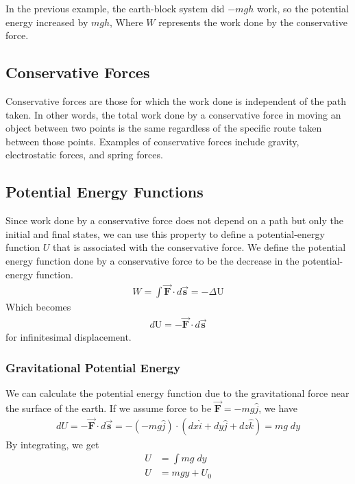 \documentclass[11pt]{article}
\begin{document}
In the previous example, the earth-block system did $-mgh$ work, so the potential energy increased by $mgh$, Where $W$ represents the work done by the conservative force.

\subsection{Conservative Forces}

Conservative forces are those for which the work done is independent of the path taken. In other words, the total work done by a conservative force in moving an object between two points is the same regardless of the specific route taken between those points. Examples of conservative forces include gravity, electrostatic forces, and spring forces.

\subsection{Potential Energy Functions}
Since work done by a conservative force does not depend on a path but only the initial and final states, we can use this property to define a potential-energy function $U$ that is associated with the conservative force. We define the potential energy function done by a conservative force to be the decrease in the potential-energy function.
\begin{align*}
    W = \int \mathbf{\Vec{F}}\cdot d\mathbf{\Vec{s}} = -\Delta \mathrm{U}
\end{align*}
Which becomes
\begin{align*}
    d\mathrm{U} = -\mathbf{\Vec{F}}\cdot d\mathbf{\Vec{s}}
\end{align*}
for infinitesimal displacement. 

\subsubsection{Gravitational Potential Energy}
We can calculate the potential energy function due to the gravitational force near the surface of the earth. If we assume force to be $\mathbf{\Vec{F}} = -mg\hat{j}$, we have
\begin{align*}
    dU = -\mathbf{\Vec{F}}\cdot d\mathbf{\Vec{s}} = -(-mg\hat{j})\cdot(dx\hat{i} + dy\hat{j} + dz\hat{k}) = mg\;dy
\end{align*}
By integrating, we get
\begin{align*}
    U &= \int mg\;dy \\
    U &= mgy + U_0 \\
\end{align*}
\end{document}
